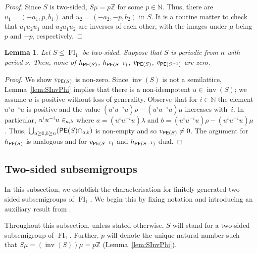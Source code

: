 \documentclass[reqno]{amsart}
\theoremstyle{plain}
\newtheorem{lem}{Lemma}[section]
\theoremstyle{definition}
\DeclareMathOperator{\inv}{inv}
\DeclareMathOperator{\FI}{FI}
\let\P\relax
\DeclareMathOperator{\P}{\textup{\textsf{P}}}
\DeclareMathOperator{\PE}{\textup{\textsf{PE}}}
\numberwithin{equation}{section}
\begin{document}
\begin{proof}
Since $S$ is two-sided, $S\mu = p\mathbb{Z}$ for some $p\in\mathbb{N}$. Thus, there are $u_1 = (-a_1, p, b_1)$ and $u_2 = (-a_2, -p, b_2)$ in $S$. It is a routine matter to check that $u_1u_2u_1$ and $u_2u_1u_2$ are inverses of each other, with the images under $\mu$ being $p$ and $-p$, respectively.
\end{proof}


\begin{lem}
\label{lem:NonZeroNums}
Let $S \leq \FI_1$ be two-sided. Suppose that $S$ is periodic from $n$ with period $\nu$. Then, none of $h_{\PE(S)}$, $h_{\PE(S^{-1})}$, $v_{\PE(S)}$, $v_{\PE(S^{-1})}$ are zero.
\end{lem}


\begin{proof}
We show $v_{\PE(S)}$ is non-zero. Since $\inv(S)$ is not a semilattice, Lemma~\ref{lem:SInvPhi} implies that
there is a non-idempotent $u\in \inv(S)$; we assume $u$ is positive without loss of generality. Observe that for $i\in\mathbb{N}$ the element $u^{i}u^{-i}u$ is positive and the value $(u^{i}u^{-i}u)\rho-(u^{i}u^{-i}u)\mu$ increases with~$i$. In particular, $u^{i}u^{-i}u\in \P_{a,b}$ where $a = (u^{i}u^{-i}u)\lambda$ and $b = (u^{i}u^{-i}u)\rho-(u^{i}u^{-i}u)\mu$. Thus, $\bigcup_{a\geq 0, b\geq n}(\PE(S)\cap \P_{a,b})$ is non-empty and so $v_{\PE(S)}\neq 0$.
The argument for $h_{\PE(S)}$ is analogous and for $v_{\PE(S^{-1})}$ and $h_{\PE(S^{-1})}$ dual.
\end{proof}


\subsection{Two-sided subsemigroups}
\label{subsec:2side}
In this subsection, we establish the characterisation for finitely generated two-sided subsemigroups of $\FI_1$. We begin this by fixing notation and introducing an auxiliary result from \cite{OliveiraSilva}.

Throughout this subsection, unless stated otherwise, $S$ will stand for a two-sided subsemigroup of $\FI_1$. Further, $p$ will denote the unique natural number such that $S\mu = (\inv(S))\mu = p\mathbb{Z}$ (Lemma~\ref{lem:SInvPhi}). 
\end{document}
